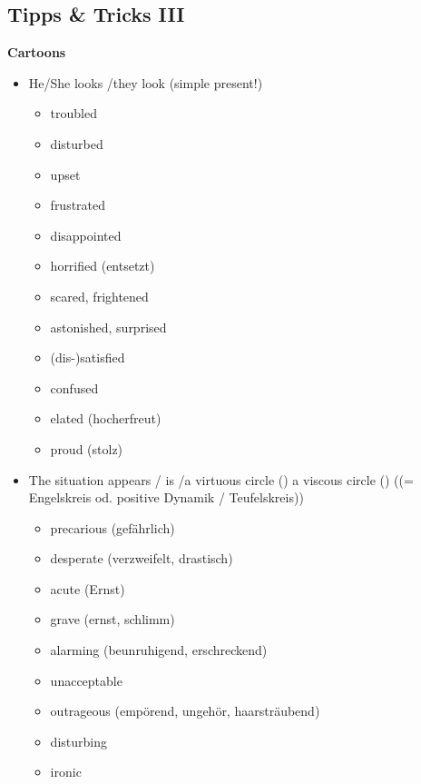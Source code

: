 \documentclass[a5paper,12pt,twoside,titlepage]{scrartcl}
\begin{document}
\subsection{Tipps \& Tricks III}
\textbf{Cartoons}
	\begin{itemize}
		\item He/She looks /they look (simple present!)
		\begin{itemize}
			\item troubled
			\item disturbed
			\item upset
			\item frustrated
			\item disappointed
			\item horrified (entsetzt)
			\item scared, frightened
			\item astonished, surprised
			\item (dis-)satisfied
			\item confused
			\item elated (hocherfreut)
			\item proud (stolz)
		\end{itemize}
		\item The situation appears / is /a virtuous circle (\smiley) a  viscous circle (\frownie) ((= Engelskreis od. positive Dynamik / Teufelskreis))
		\begin{itemize}
			\item precarious (gefährlich)
			\item desperate (verzweifelt, drastisch)
			\item acute (Ernst)
			\item grave (ernst, schlimm)
			\item alarming (beunruhigend, erschreckend)
			\item unacceptable
			\item outrageous (empörend, ungehör, haarsträubend)
			\item disturbing
			\item ironic
		\end{itemize}
	\end{itemize}
\newpage
\end{document}
